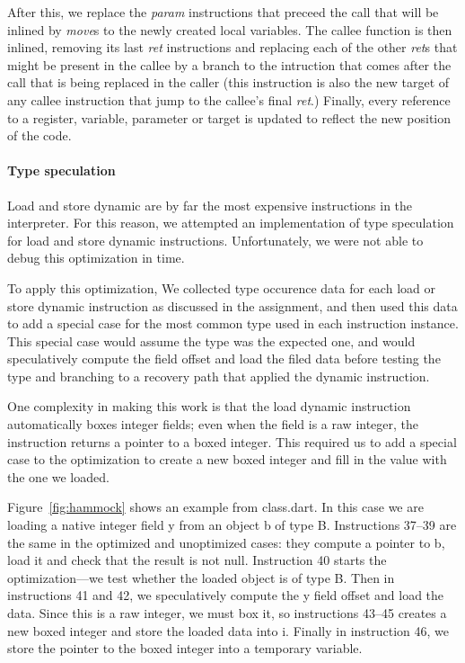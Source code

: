 \documentclass[10pt,twocolumn]{article}
\begin{document}
After this, we replace the \emph{param} instructions that preceed the call that will be inlined by \emph{move}s to the newly created local variables. The callee function is then
inlined, removing its last \emph{ret} instructions and replacing each of the other \emph{ret}s that might be present in the callee by a branch to the intruction that comes after
the call that is being replaced in the caller (this instruction is also the new target of any callee instruction that jump to the callee's final \emph{ret}.) Finally, every reference to a register, variable, parameter or target is updated to reflect the new position of the code.

\paragraph{Type speculation}

Load and store dynamic are by far the most expensive instructions in
the interpreter. For this reason, we attempted an implementation of
type speculation for load and store dynamic
instructions. Unfortunately, we were not able to debug this
optimization in time.

To apply this optimization, We collected type occurence data for each
load or store dynamic instruction as discussed in the assignment, and
then used this data to add a special case for the most common type
used in each instruction instance. This special case would assume the
type was the expected one, and would speculatively compute the field
offset and load the filed data before testing the type and branching
to a recovery path that applied the dynamic instruction. 

One complexity in making this work is that the load dynamic
instruction automatically boxes integer fields; even when the field is
a raw integer, the instruction returns a pointer to a boxed
integer. This required us to add a special case to the optimization to
create a new boxed integer and fill in the value with the one we
loaded.

Figure~\ref{fig:hammock} shows an example from class.dart. In this
case we are loading a native integer field y from an object b of type
B. Instructions 37--39 are the same in the optimized and unoptimized
cases: they compute a pointer to b, load it and check that the result
is not null. Instruction 40 starts the optimization---we test whether
the loaded object is of type B. Then in instructions 41 and 42, we
speculatively compute the y field offset and load the data. Since this
is a raw integer, we must box it, so instructions 43--45 creates a new
boxed integer and store the loaded data into i. Finally in instruction
46, we store the pointer to the boxed integer into a temporary variable. 
\end{document}

